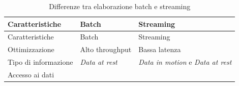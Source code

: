 \documentclass[italian,a4paper, twoside, 12pt]{report}
\begin{document}
\begin{longtable}[]{@{}lll@{}}
\caption{Differenze tra elaborazione batch e streaming}\tabularnewline
\toprule
\begin{minipage}[b]{0.27\columnwidth}\raggedright\strut
Caratteristiche\strut
\end{minipage} & \begin{minipage}[b]{0.21\columnwidth}\raggedright\strut
Batch\strut
\end{minipage} & \begin{minipage}[b]{0.43\columnwidth}\raggedright\strut
Streaming\strut
\end{minipage}\tabularnewline
\midrule
\endfirsthead
\toprule
\begin{minipage}[b]{0.27\columnwidth}\raggedright\strut
Caratteristiche\strut
\end{minipage} & \begin{minipage}[b]{0.21\columnwidth}\raggedright\strut
Batch\strut
\end{minipage} & \begin{minipage}[b]{0.43\columnwidth}\raggedright\strut
Streaming\strut
\end{minipage}\tabularnewline
\midrule
\endhead
\begin{minipage}[t]{0.27\columnwidth}\raggedright\strut
Ottimizzazione\strut
\end{minipage} & \begin{minipage}[t]{0.21\columnwidth}\raggedright\strut
Alto throughput\strut
\end{minipage} & \begin{minipage}[t]{0.43\columnwidth}\raggedright\strut
Bassa latenza\strut
\end{minipage}\tabularnewline
\begin{minipage}[t]{0.27\columnwidth}\raggedright\strut
Tipo di informazione\strut
\end{minipage} & \begin{minipage}[t]{0.21\columnwidth}\raggedright\strut
\emph{Data at rest}\strut
\end{minipage} & \begin{minipage}[t]{0.43\columnwidth}\raggedright\strut
\emph{Data in motion} e \emph{Data at rest}\strut
\end{minipage}\tabularnewline
\begin{minipage}[t]{0.27\columnwidth}\raggedright\strut
Accesso ai dati\strut
\end{minipage} & \begin{minipage}[t]{0.21\columnwidth}\raggedright\strut

\end{minipage}
\end{longtable}
\end{document}
